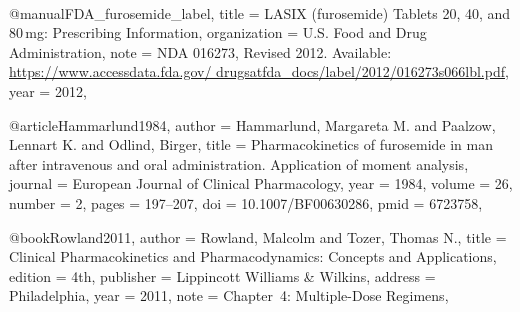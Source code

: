 
@manual{FDA_furosemide_label,
  title        = {{LASIX\textsuperscript{\textregistered}
                   (furosemide) Tablets 20, 40, and 80\,mg:
                   Prescribing Information}},
  organization = {{U.S. Food and Drug Administration}},
  note         = {NDA 016273, Revised 2012.
                  Available: \url{https://www.accessdata.fda.gov/
                  drugsatfda_docs/label/2012/016273s066lbl.pdf}},
  year         = {2012},
}

@article{Hammarlund1984,
  author  = {Hammarlund, Margareta M. and
             Paalzow, Lennart K. and
             Odlind, Birger},
  title   = {Pharmacokinetics of furosemide in man after intravenous
             and oral administration. {Application} of moment analysis},
  journal = {European Journal of Clinical Pharmacology},
  year    = {1984},
  volume  = {26},
  number  = {2},
  pages   = {197--207},
  doi     = {10.1007/BF00630286},
  pmid    = {6723758},
}

@book{Rowland2011,
  author    = {Rowland, Malcolm and Tozer, Thomas N.},
  title     = {Clinical Pharmacokinetics and Pharmacodynamics:
               Concepts and Applications},
  edition   = {4th},
  publisher = {Lippincott Williams \& Wilkins},
  address   = {Philadelphia},
  year      = {2011},
  note      = {Chapter~4: Multiple-Dose Regimens},
}
